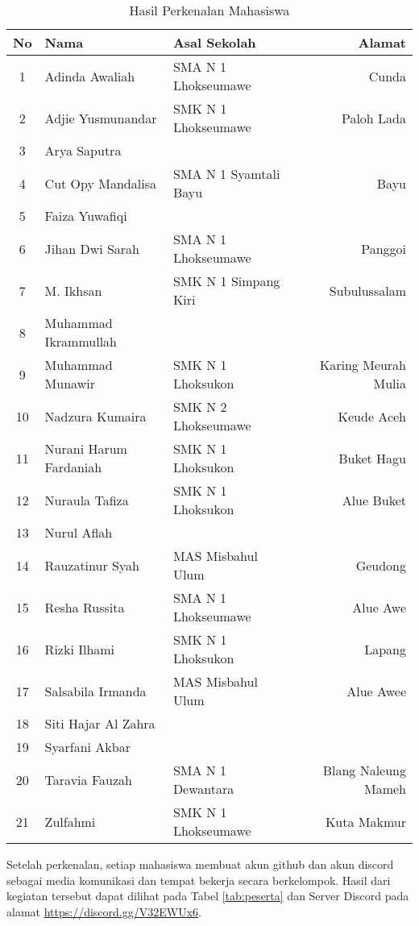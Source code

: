 \documentclass[a4paper]{tufte-handout}
\begin{document}
\begin{table}[!ht]
\vspace*{.5cm}
\caption{Hasil Perkenalan Mahasiswa}
\label{tab:perkenalan}
\centering
\begin{tabular}{cllr} 
\toprule
No & Nama 					& Asal Sekolah 			& Alamat\\
\midrule
1 & Adinda Awaliah			& SMA N 1 Lhokseumawe 	& Cunda \\
2 & Adjie Yusmunandar		& SMK N 1 Lhokseumawe &Paloh Lada \\
3 & Arya Saputra			& & \\
4 & Cut Opy Mandalisa		& SMA N 1 Syamtali Bayu	& Bayu \\
5 & Faiza Yuwafiqi			& & \\
6 & Jihan Dwi Sarah			& SMA N 1 Lhokseumawe 	& Panggoi \\
7 & M. Ikhsan				& SMK N 1 Simpang Kiri 	& Subulussalam \\
\midrule
8 & Muhammad Ikrammullah	& & \\
9 & Muhammad Munawir		& SMK N 1 Lhoksukon		& Karing Meurah Mulia \\
10 & Nadzura Kumaira		& SMK N 2 Lhokseumawe 	& Keude Aceh \\
11 & Nurani Harum Fardaniah	& SMK N 1 Lhoksukon 	& Buket Hagu \\
12 & Nuraula Tafiza			& SMK N 1 Lhoksukon 	& Alue Buket \\
13 & Nurul Aflah			& & \\
14 & Rauzatinur Syah		& MAS Misbahul Ulum 	& Geudong \\
\midrule
15 & Resha Russita			& SMA N 1 Lhokseumawe 	& Alue Awe \\
16 & Rizki Ilhami			& SMK N 1 Lhoksukon 	& Lapang \\
17 & Salsabila Irmanda		& MAS Misbahul Ulum 	& Alue Awee \\
18 & Siti Hajar Al Zahra	& & \\
19 & Syarfani Akbar			& & \\
20 & Taravia Fauzah			& SMA N 1 Dewantara 	& Blang Naleung Mameh \\
21 & Zulfahmi				& SMK N 1 Lhokseumawe	& Kuta Makmur \\
\bottomrule
\end{tabular}
\end{table}

Setelah perkenalan, setiap mahasiswa membuat akun github dan akun discord sebagai media komunikasi dan tempat bekerja secara berkelompok. Hasil dari kegiatan tersebut dapat dilihat pada Tabel \ref{tab:peserta} dan Server Discord pada alamat \url{https://discord.gg/V32EWUx6}.
\end{document}
